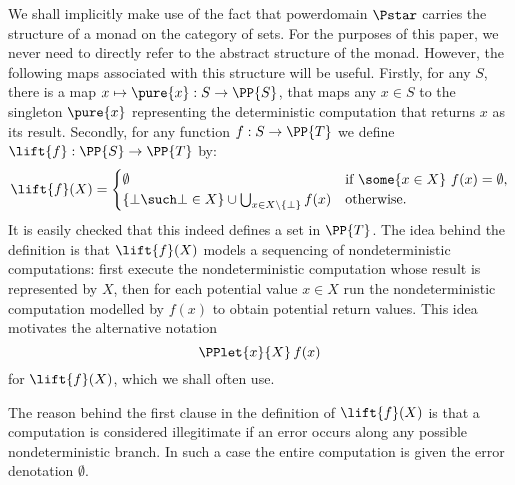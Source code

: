 We shall implicitly make use of  the fact that powerdomain $\Pstar$ carries the structure of a monad on the category of sets. For the purposes of this paper, we never need to directly refer to the abstract structure of the monad. However, the following maps associated with this structure will be useful. Firstly, for any $S$, there is a map $x \mapsto \pure{x} : S \to \PP{S}$, that maps any $x \in S$ to the singleton $\pure{x}$ representing the deterministic computation that returns $x$ as its result. 
Secondly, for any function $f : S \to  \PP{T}$ we define $\lift{f} : \PP{S} \to  \PP{T}$ by:
\[
\lift{f}(X) = 
\begin{cases} 
\emptyset & \text{if $\some{x \in X}\ f(x)= \emptyset$,}\\
\textstyle
\{\bot \such \bot \in X\} \cup \bigcup_{x \in X \setminus \{\bot\}} f(x) & \text{otherwise.}
\end{cases}
\]
It is easily checked that this indeed defines a set in $\PP{T}$. The idea behind the definition is that 
$\lift{f}(X)$ models a sequencing of nondeterministic computations: first execute the nondeterministic computation whose result is represented by $X$, then for each potential value $x \in X$
run the nondeterministic computation modelled by $f(x)$ to obtain potential return values.
This idea motivates the alternative notation
\[
\PPlet{x}{X}\, f(x)
\]
for  $\lift{f}(X)$, which we shall often use.

The reason behind the first clause in the definition of 
$\lift{f}(X)$ is that a computation is considered illegitimate if an error occurs along any possible nondeterministic branch. In such a case the entire computation is given the error denotation $\emptyset$.

